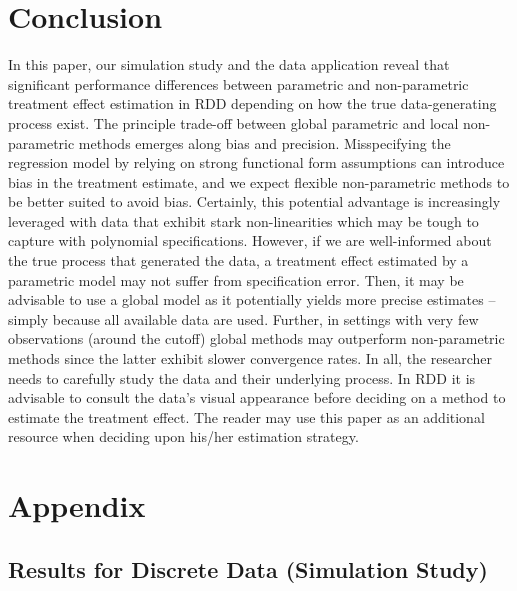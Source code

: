 \documentclass[11pt, a4paper, leqno]{article}
\numberwithin{equation}{section}
\numberwithin{figure}{section}
\numberwithin{table}{section}
\numberwithin{algorithm}{section}
\begin{document}
\section{Conclusion} %
\label{sec: conclusion}
In this paper, our simulation study and the data application reveal that significant performance differences between parametric and non-parametric treatment effect estimation in RDD depending on how the true data-generating process exist. The principle trade-off between global parametric and local non-parametric methods emerges along bias and precision. Misspecifying the regression model by relying on strong functional form assumptions can introduce bias in the treatment estimate, and we expect flexible non-parametric methods to be better suited to avoid bias. Certainly, this potential advantage is increasingly leveraged with data that exhibit stark non-linearities which may be tough to capture with polynomial specifications. However, if we are well-informed about the true process that generated the data, a treatment effect estimated by a parametric model may not suffer from specification error. Then, it may be advisable to use a global model as it potentially yields more precise estimates -- simply because all available data are used. Further, in settings with very few observations (around the cutoff) global methods may outperform non-parametric methods since the latter exhibit slower convergence rates. In all, the researcher needs to carefully study the data and their underlying process. In RDD it is advisable to consult the data's visual appearance before deciding on a method to estimate the treatment effect. The reader may use this paper as an additional resource when deciding upon his/her estimation strategy.


\clearpage

\clearpage

\setcounter{section}{1}
\renewcommand\thesubsection{\Alph{subsection}}
\renewcommand\thetable{\Alph{section}.\arabic{table}}

\section*{\LARGE Appendix}
\subsection{Results for Discrete Data (Simulation Study)} \label{discrete_data}
\end{document}
